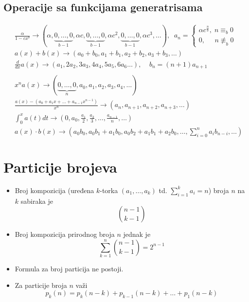 \documentclass[a4paper,12pt,twoside]{report}
\numberwithin{algorithm}{section}
\begin{document}
\subsection{Operacije sa funkcijama generatrisama}
\[
    \begin{aligned}
        &\frac{\alpha}{1 - cx^b} \rightarrow (\alpha, \underbrace{0, \dots, 0}_{b - 1}, \alpha c, \underbrace{0, \dots, 0}_{b - 1}, \alpha c^2, \underbrace{0, \dots, 0}_{b - 1}, \alpha c^3, \dots), \;\; a_n = \begin{cases}
            \alpha c^{\frac{n}{b}}, \; n \equiv_{b} 0 \\
            0, \;\;\;\;\; n \not\equiv_{b} 0
        \end{cases}\\
        &a(x) + b(x) \rightarrow (a_0 + b_0, a_1 + b_1, a_2 + b_2, a_3 + b_3, \dots)   \\
        &\frac{d}{dx} a(x) \rightarrow (a_1, 2a_2, 3a_3, 4a_4, 5a_5, 6a_6 \dots), \;\;\;\; b_n = (n + 1)a_{n + 1} \\ \\
        &x^n a(x) \rightarrow (\underbrace{0, \dots, 0}_{n}, a_0, a_1, a_2, a_3, a_4, \dots) \\
        &\frac{a(x) - (a_0 + a_1x + \dots + a_{n - 1}x^{n - 1})}{x^n} \rightarrow (a_n, a_{n +1}, a_{n + 2}, a_{n + 3}, \dots) \\
        &\int_{0}^{x} a(t) dt \rightarrow (0, a_0, \frac{a_1}{2}, \frac{a_2}{3}, \dots, \frac{a_{n - 1}}{n}, \dots) \\
        &a(x) \cdot b(x) \rightarrow (a_0 b_0, a_0 b_1 + a_1 b_0, a_0 b_2 + a_1 b_1 + a_2 b _0, \dots, \sum_{i = 0}^{n} a_i b_{n - i}, \dots)
    \end{aligned}
\]
\section{Particije brojeva}
\begin{itemize}
    \item Broj kompozicija (uređena $k$-torka $(a_1, \dots, a_k)$ td. $\sum_{i = 1}^{k} a_i = n$) broja $n$ na $k$ sabiraka je
    \[
        {{n - 1} \choose {k - 1}}
    \]
    \item Broj kompozicija prirodnog broja $n$ jednak je
    \[
        \sum_{k = 1}^{n} {{n-1} \choose {k-1}} = 2^{n-1}
    \]
    \item Formula za broj particija ne postoji.
    \item Za particije broja $n$ važi
    \[
        p_k(n) = p_k(n - k) + p_{k - 1}(n - k) + \dots + p_1(n - k)
    \]
\end{itemize}
\end{document}
